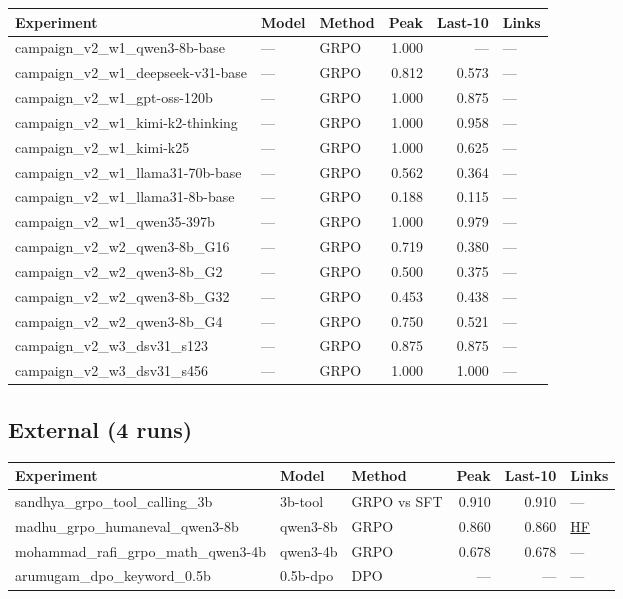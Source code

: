 \documentclass[12pt,a4paper]{report}
\theoremstyle{definition}
\begin{document}
{\small
\begin{longtable}{p{3.5cm}p{2cm}p{1.2cm}rrp{3.5cm}}
\toprule
\textbf{Experiment} & \textbf{Model} & \textbf{Method} & \textbf{Peak} & \textbf{Last-10} & \textbf{Links} \\
\midrule
\endhead
campaign\_v2\_w1\_qwen3-8b-base & --- & GRPO & 1.000 & --- & --- \\
campaign\_v2\_w1\_deepseek-v31-base & --- & GRPO & 0.812 & 0.573 & --- \\
campaign\_v2\_w1\_gpt-oss-120b & --- & GRPO & 1.000 & 0.875 & --- \\
campaign\_v2\_w1\_kimi-k2-thinking & --- & GRPO & 1.000 & 0.958 & --- \\
campaign\_v2\_w1\_kimi-k25 & --- & GRPO & 1.000 & 0.625 & --- \\
campaign\_v2\_w1\_llama31-70b-base & --- & GRPO & 0.562 & 0.364 & --- \\
campaign\_v2\_w1\_llama31-8b-base & --- & GRPO & 0.188 & 0.115 & --- \\
campaign\_v2\_w1\_qwen35-397b & --- & GRPO & 1.000 & 0.979 & --- \\
campaign\_v2\_w2\_qwen3-8b\_G16 & --- & GRPO & 0.719 & 0.380 & --- \\
campaign\_v2\_w2\_qwen3-8b\_G2 & --- & GRPO & 0.500 & 0.375 & --- \\
campaign\_v2\_w2\_qwen3-8b\_G32 & --- & GRPO & 0.453 & 0.438 & --- \\
campaign\_v2\_w2\_qwen3-8b\_G4 & --- & GRPO & 0.750 & 0.521 & --- \\
campaign\_v2\_w3\_dsv31\_s123 & --- & GRPO & 0.875 & 0.875 & --- \\
campaign\_v2\_w3\_dsv31\_s456 & --- & GRPO & 1.000 & 1.000 & --- \\
\bottomrule
\end{longtable}
}

\subsection{External (4 runs)}
\label{sec:registry-external}

{\small
\begin{longtable}{p{3.5cm}p{2cm}p{1.2cm}rrp{3.5cm}}
\toprule
\textbf{Experiment} & \textbf{Model} & \textbf{Method} & \textbf{Peak} & \textbf{Last-10} & \textbf{Links} \\
\midrule
\endhead
sandhya\_grpo\_tool\_calling\_3b & 3b-tool & GRPO vs SFT & 0.910 & 0.910 & --- \\
madhu\_grpo\_humaneval\_qwen3-8b & qwen3-8b & GRPO & 0.860 & 0.860 & \href{https://github.com/madhukumara1993/qwen3-grpo}{HF} \\
mohammad\_rafi\_grpo\_math\_qwen3-4b & qwen3-4b & GRPO & 0.678 & 0.678 & --- \\
arumugam\_dpo\_keyword\_0.5b & 0.5b-dpo & DPO & --- & --- & --- \\
\bottomrule
\end{longtable}
}
\end{document}
